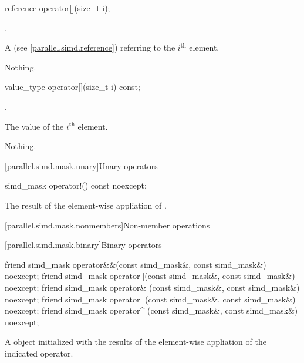 \begin{itemdecl}
reference operator[](size_t i);
\end{itemdecl}

\begin{itemdescr}
  \pnum\requires
  .

  \pnum\returns
  A  (see \ref{parallel.simd.reference}) referring to the $i^\text{th}$ element.

  \pnum\throws Nothing.
\end{itemdescr}

\begin{itemdecl}
value_type operator[](size_t i) const;
\end{itemdecl}

\begin{itemdescr}
  \pnum\requires
  .

  \pnum\returns
  The value of the $i^\text{th}$ element.

  \pnum\throws Nothing.
\end{itemdescr}

[parallel.simd.mask.unary]{Unary operators}

\begin{itemdecl}
simd_mask operator!() const noexcept;
\end{itemdecl}

\begin{itemdescr}
  \pnum\returns
  The result of the element-wise appliation of .
\end{itemdescr}

[parallel.simd.mask.nonmembers]{Non-member operations}

[parallel.simd.mask.binary]{Binary operators}

\begin{itemdecl}
friend simd_mask operator&&(const simd_mask&, const simd_mask&) noexcept;
friend simd_mask operator||(const simd_mask&, const simd_mask&) noexcept;
friend simd_mask operator& (const simd_mask&, const simd_mask&) noexcept;
friend simd_mask operator| (const simd_mask&, const simd_mask&) noexcept;
friend simd_mask operator^ (const simd_mask&, const simd_mask&) noexcept;
\end{itemdecl}

\begin{itemdescr}
  \pnum\returns
  A  object initialized with the results of the element-wise appliation of the indicated operator.
\end{itemdescr}

